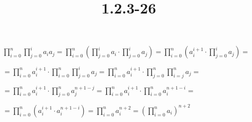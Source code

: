 \documentclass{article}
\title{1.2.3-26}
\begin{document}
\maketitle

$\prod_{i=0}^n\prod_{j=0}^i a_ia_j = \prod_{i=0}^n(\prod_{j=0}^i a_i \cdot \prod_{j=0}^i a_j) = \prod_{i=0}^n(a_i^{i+1} \cdot \prod_{j=0}^i a_j) =$

$= \prod_{i=0}^n a_i^{i+1} \cdot \prod_{i=0}^n \prod_{j=0}^i a_j = \prod_{i=0}^n a_i^{i+1} \cdot \prod_{j=0}^n \prod_{i=j}^n a_j =$

$= \prod_{i=0}^n a_i^{i+1} \cdot \prod_{j=0}^n a_j^{n+1-j} = \prod_{i=0}^n a_i^{i+1} \cdot \prod_{i=0}^n a_i^{n+1-i} =$

$= \prod_{i=0}^n (a_i^{i+1} \cdot a_i^{n+1-i}) = \prod_{i=0}^n a_i^{n+2} = (\prod_{i=0}^n a_i)^{n+2}$
\end{document}
